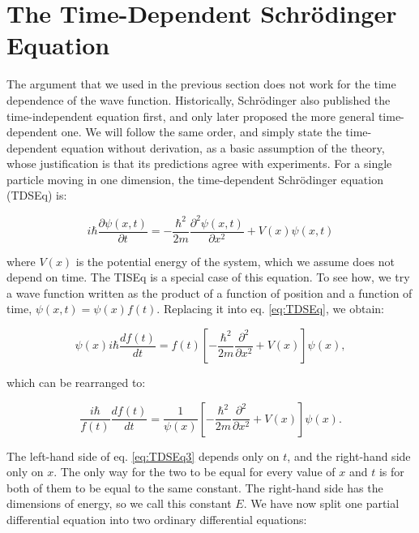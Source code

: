 \documentclass[
  english,
  9pt,
]{extbook}
\theoremstyle{definition}
\theoremstyle{definition}
\theoremstyle{definition}
\theoremstyle{definition}
\theoremstyle{remark}
\begin{document}
\section{The Time-Dependent Schrödinger Equation}\label{the-time-dependent-schruxf6dinger-equation}

The argument that we used in the previous section does not work for the time dependence of the wave function. Historically, Schrödinger also published the time-independent equation first, and only later proposed the more general time-dependent one. We will follow the same order, and simply state the time-dependent equation without derivation, as a basic assumption of the theory, whose justification is that its predictions agree with experiments. For a single particle moving in one dimension, the time-dependent Schrödinger equation (TDSEq) is:

\begin{equation}
i\hbar\frac{\partial \psi(x,t)}{\partial t}=-\frac{\hbar^2}{2m} \frac{\partial^2 \psi(x,t)}{\partial x^2}+V(x)\psi(x,t)
\label{eq:TDSEq}
\end{equation}

where \(V(x)\) is the potential energy of the system, which we assume does not depend on time. The TISEq is a special case of this equation. To see how, we try a wave function written as the product of a function of position and a function of time, \(\psi(x, t) = \psi(x) f(t)\). Replacing it into eq. \eqref{eq:TDSEq}, we obtain:

\begin{equation}
\psi(x) i \hbar \frac{df(t)}{dt} = f(t) \left[-\frac{\hbar^2}{2m} \frac{\partial^2}{\partial x^2} + V(x) \right] \psi(x),
\label{eq:TDSEq2}
\end{equation}

which can be rearranged to:

\begin{equation}
\frac{i \hbar}{f(t)} \frac{df(t)}{dt} = \frac{1}{\psi(x)} \left[-\frac{\hbar^2}{2m} \frac{\partial^2}{\partial x^2} + V(x) \right] \psi(x).
\label{eq:TDSEq3}
\end{equation}

The left-hand side of eq. \eqref{eq:TDSEq3} depends only on \(t\), and the right-hand side only on \(x\). The only way for the two to be equal for every value of \(x\) and \(t\) is for both of them to be equal to the same constant. The right-hand side has the dimensions of energy, so we call this constant \(E\). We have now split one partial differential equation into two ordinary differential equations:
\end{document}
